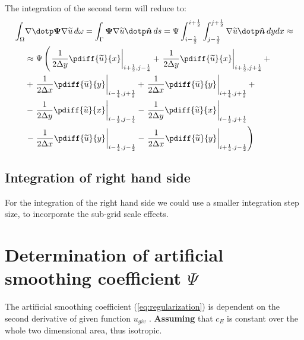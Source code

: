 The integration of the second  term will reduce to:
\begin{align}
    \int_\Omega & \nabla \dotp \bPsi \nabla \widetilde{u}\, d\omega  =
    \int_\Gamma \bPsi \nabla \widetilde{u} \dotp \vec{\hat n}\, ds =
    \Psi
    \int_{i-\half}^{i+\half} \int_{j-\half}^{j+\half} \nabla \widetilde{u} \dotp \vec{\hat n}\, dy dx
    \approx
    \\
    & \approx
      \Psi \left(
      \left. \frac{1}{2\Dy} \pdiff{\widetilde{u}}{x}  \right|_{i+\half,j-\quart}
    + \left. \frac{1}{2\Dy} \pdiff{\widetilde{u}}{x}  \right|_{i+\half,j+\quart} +
    \right.
    \\
    &
    + \left. \frac{1}{2\Dx} \pdiff{\widetilde{u}}{y}  \right|_{i-\quart,j+\half}
    + \left. \frac{1}{2\Dx} \pdiff{\widetilde{u}}{y}  \right|_{i+\quart,j+\half} +
    \\
    &
    - \left. \frac{1}{2\Dy} \pdiff{\widetilde{u}}{x} \right|_{i-\half,j-\quart}
    - \left. \frac{1}{2\Dy} \pdiff{\widetilde{u}}{x} \right|_{i-\half,j+\quart}
    \\
    &
    \left.
    - \left. \frac{1}{2\Dx} \pdiff{\widetilde{u}}{y}   \right|_{i-\quart,j-\half}
    - \left. \frac{1}{2\Dx} \pdiff{\widetilde{u}}{y}   \right|_{i+\quart,j-\half}
    \right)
\end{align}
\subsection*{Integration of right hand side}
For the integration of the right hand side we could use a smaller integration step size, to incorporate the sub-grid scale effects.

\section{Determination of artificial smoothing coefficient $\Psi$}
The artificial smoothing coefficient (\autoref{eq:regularization}) is dependent on the second derivative of given function $u_{giv}$ \citep[eq.\ 8]{Borsboom1998}.
\textbf{Assuming} that $c_E$ is constant over the whole two dimensional area, thus isotropic.


